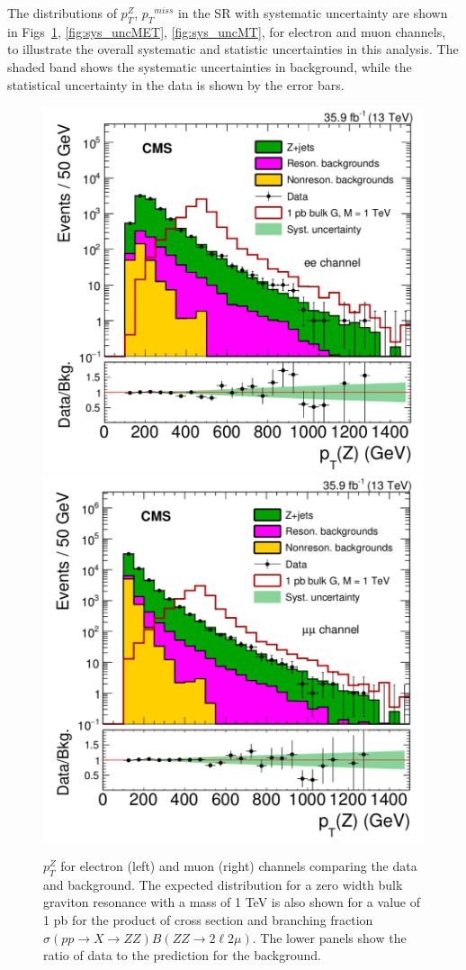 \vspace{0.3cm}
The distributions of $p_T ^Z$, ${p_{T}}^{miss}$ in the SR with systematic uncertainty are shown in Figs~\ref{fig:sys_uncZpt}, \ref{fig:sys_uncMET}, \ref{fig:sys_uncMT}, for electron and muon channels, to illustrate the overall systematic and statistic uncertainties in this analysis. The shaded band shows the systematic uncertainties in background, while the statistical uncertainty in the data is shown by the error bars.
\begin{figure}[htbp]
\begin{center}
\includegraphics[width=0.49\linewidth]{figures/sys_elSRuncZpt.png}
\includegraphics[width=0.49\linewidth]{figures/sys_muSRuncZpt.png}
\caption{$p_T ^Z$ for electron (left) and muon (right) channels comparing the data and background. The expected distribution for a zero width bulk graviton resonance with a mass of 1 TeV is also shown for a value of 1 pb for the product of cross section and branching fraction $\sigma(pp\rightarrow X\rightarrow ZZ)B(ZZ\rightarrow 2\ell 2\mu)$. The lower panels show the ratio of data to the prediction for the background. }
\label{fig:sys_uncZpt}
\end{center}
\end{figure}

